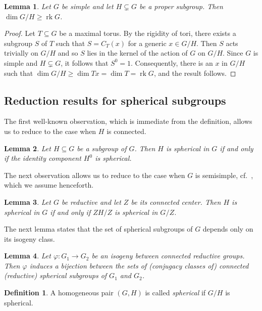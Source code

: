 \documentclass[12pt]{amsart}
\renewcommand{\phi}{\varphi}
\newcommand\rk{\operatorname{rk}}
\numberwithin{equation}{section}
\newtheorem{lemma}[lemma]{Lemma}
\theoremstyle{definition}
\newtheorem{definition}[definition]{Definition}
\begin{document}
\begin{lemma}
  \label{lem:4}
  Let $G$ be simple and let $H\subsetneq G$ be a proper subgroup. Then
  $\dim G/H \geqslant \rk G$.
\end{lemma}


\begin{proof}
  Let $T \subseteq G$ be a maximal torus.  By the rigidity of tori,
  there exists a subgroup $S$ of $T$ such that $S = C_T(x)$ for a
  generic $x \in G/H$. Then $S$ acts trivially on $G/H$ and so $S$
  lies in the kernel of the action of $G$ on $G/H$. Since $G$ is
  simple and $H \subsetneq G$, it follows that $S^0 =
  1$. Consequently, there is an $x$ in $G/H$ such that
  $\dim G/H \geqslant \dim Tx = \dim T = \rk G$, and the result follows.
\end{proof}

\subsection{Reduction results for spherical subgroups}

The first well-known observation, which is immediate from the
definition, allows us to reduce to the case when $H$ is connected.

\begin{lemma}
  \label{lemma0}
  Let $H\subseteq G$ be a subgroup of $G$.  Then $H$ is spherical in
  $G$ if and only if the identity component $H^0$ is spherical.
\end{lemma}

The next observation allows us to reduce to the case when $G$ is
semisimple, cf.~\cite[\S 4]{Kr}, which we assume henceforth.

\begin{lemma}
  \label{lem:ss}
  Let $G$ be reductive and let $Z$ be its connected center. Then $H$
  is spherical in $G$ if and only if $ZH/Z$ is spherical in $G/Z$.
\end{lemma}

The next lemma states that the set of spherical subgroups of $G$
depends only on its isogeny class.

\begin{lemma}
  \label{lem:isogeny}
  Let $\phi:G_1\to G_2$ be an isogeny between connected reductive
  groups.  Then $\phi$ induces a bijection between the sets of
  (conjugacy classes of) connected (reductive) spherical subgroups of
  $G_1$ and $G_2$.
\end{lemma}

\begin{definition}
	\label{def:sphpair}
	A homogeneous pair $(G,H)$ is called \emph{spherical} if $G/H$ is	spherical. 
\end{definition}
\end{document}
